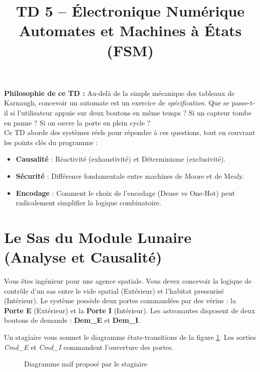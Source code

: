 \documentclass[a4paper,11pt]{article}
\title{\textcolor{primary}{\Huge\bfseries TD 5 -- Électronique Numérique}\\[0.5em] \Large Automates et Machines à États (FSM)}
\author{}
\date{}
\begin{document}
\maketitle
\vspace{-2em}

\begin{notebox}
\textbf{Philosophie de ce TD :} Au-delà de la simple mécanique des tableaux de Karnaugh, concevoir un automate est un exercice de \textit{spécification}. Que se passe-t-il si l'utilisateur appuie sur deux boutons en même temps ? Si un capteur tombe en panne ? Si on ouvre la porte en plein cycle ? \\
Ce TD aborde des systèmes réels pour répondre à ces questions, tout en couvrant les points clés du programme :
\begin{itemize}
\item \textbf{Causalité} : Réactivité (exhaustivité) et Déterminisme (exclusivité).
\item \textbf{Sécurité} : Différence fondamentale entre machines de Moore et de Mealy.
\item \textbf{Encodage} : Comment le choix de l'encodage (Dense vs One-Hot) peut radicalement simplifier la logique combinatoire.
\end{itemize}
\end{notebox}
\vspace{1em}

\section{Le Sas du Module Lunaire (Analyse et Causalité)}
Vous êtes ingénieur pour une agence spatiale. Vous devez concevoir la logique de contrôle d'un sas entre le vide spatial (Extérieur) et l'habitat pressurisé (Intérieur).
Le système possède deux portes commandées par des vérins : la \textbf{Porte E} (Extérieur) et la \textbf{Porte I} (Intérieur).
Les astronautes disposent de deux boutons de demande : \textbf{Dem\_E} et \textbf{Dem\_I}.

Un stagiaire vous soumet le diagramme états-transitions de la figure \ref{fig:sas_naif}. Les sorties \textit{Cmd\_E} et \textit{Cmd\_I} commandent l'ouverture des portes.

\begin{figure}[H]
\centering
{}
\caption{Diagramme naïf proposé par le stagiaire}
\label{fig:sas_naif}
\end{figure}
\end{document}
